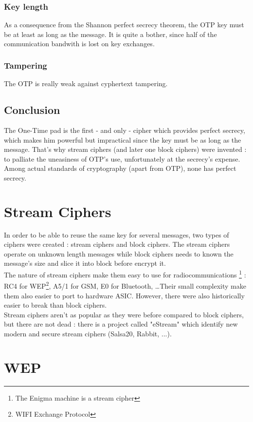 \subsubsection{Key length}
As a consequence from the Shannon perfect secrecy theorem, the OTP key must be at least as long as the message. It is quite a bother, since half of the communication bandwith is lost on key exchanges.

\subsubsection{Tampering}
The OTP is really weak against cyphertext tampering.

\subsection{Conclusion}

The One-Time pad is the first - and only - cipher which provides perfect secrecy, which makes him powerful but impractical since the key must be as long as the message. That's why stream ciphers (and later one block ciphers) were invented : to palliate the uneasiness of OTP's use, unfortunately at the secrecy's expense. Among actual standards of cryptography (apart from OTP), none has perfect secrecy. 

\section{ Stream Ciphers }

In order to be able to reuse the same key for several messages, two types of ciphers were created : stream ciphers and block ciphers. The stream ciphers operate on unknown length messages while block ciphers needs to known the message's size and slice it into block before encrypt it.\\
The nature of stream ciphers make them easy to use for radiocommunications \footnote{The Enigma machine is a stream cipher} : RC4 for WEP\footnote{WIFI Exchange Protocol}, A5/1 for GSM, E0 for Bluetooth, \dots Their small complexity make them also easier to port to hardware ASIC. However, there were also historically easier to break than block ciphers.\\
Stream ciphers aren't as popular as they were before compared to block ciphers, but there are not dead : there is a project called "eStream" which identify new modern and secure stream ciphers (Salsa20, Rabbit, ...). 

\section{WEP}

